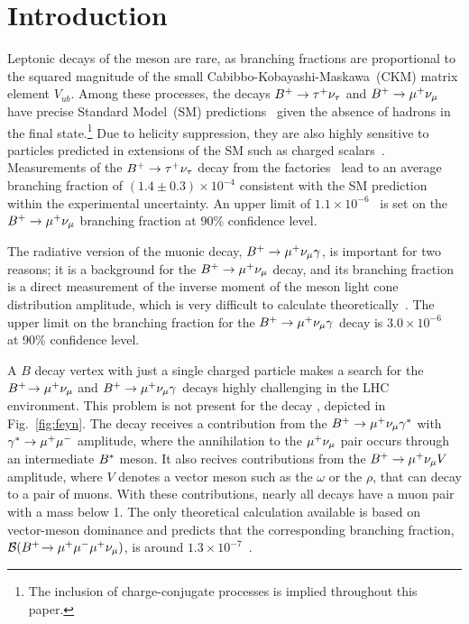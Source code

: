 
\section{Introduction}
\label{sec:Introduction}

Leptonic decays of the \Bp meson are rare, as branching fractions are proportional to the squared magnitude of the small
Cabibbo-Kobayashi-Maskawa~(CKM) matrix element $V_{ub}$. Among these
processes, the decays  $B^{+}\rightarrow{\ensuremath{\tau^+}}{\ensuremath{{\nu}_\tau}}$ and ${{{B}^+}}\rightarrow{\ensuremath{\mu^+}}{\ensuremath{{\nu}_\mu}}$ have
precise Standard Model~(SM) predictions~\cite{Silverman:1988gc} given
the absence of hadrons in the final state.\footnote{The inclusion of
charge-conjugate processes is implied throughout this paper.}  Due to
helicity suppression, they are also highly sensitive to particles
predicted in extensions of the SM such as charged
scalars~\cite{Isidori:2006pk}. Measurements of the ${{{B}^+}}\rightarrow{\ensuremath{\tau^+}}{\ensuremath{{\nu}_\tau}}$
decay from the \B factories~\cite{Kronenbitter:2015kls, Adachi:2012mm, 
Lees:2012ju,Aubert:2009wt} lead to an average branching fraction of 
$(1.4\pm0.3)\times 10^{-4}$\cite{HFLAV16} consistent with the SM 
prediction within the experimental uncertainty. An upper limit of $1.1\times 10^{-6}$~\cite{Sibidanov:2017vph} is set on the ${{{B}^+}}\rightarrow{\ensuremath{\mu^+}}{\ensuremath{{\nu}_\mu}}$ branching fraction at 90\% confidence level.

The radiative version of the muonic decay, ${{{B}^+}}\rightarrow{\ensuremath{\mu^+}}{\ensuremath{{\nu}_\mu}}\gamma$, is important for two reasons; it 
is a background for the ${{{B}^+}}\rightarrow{\ensuremath{\mu^+}}{\ensuremath{{\nu}_\mu}}$ decay, and its branching fraction is a direct measurement of the 
inverse moment of the \B meson light cone distribution amplitude, which
is very difficult to calculate theoretically~\cite{Beneke:2011nf}.
The upper limit on the branching fraction for the ${{{B}^+}}\rightarrow{\ensuremath{\mu^+}}{\ensuremath{{\nu}_\mu}}\gamma$ decay is $3.0\times
10^{-6}$~\cite{Gelb:2018end} at 90\%
confidence level.

A $B$ decay vertex with just a single charged particle makes a search for the \mbox{${{{B}^+}}\!\rightarrow \mu^{+}\nu_\mu$} and ${{{B}^+}}\rightarrow{\ensuremath{\mu^+}}{\ensuremath{{\nu}_\mu}}\gamma$ decays highly challenging in the LHC environment. This problem is not present for the decay \mbox{\Bmumumu}, depicted in Fig.~\ref{fig:feyn}. The decay receives a contribution from the ${{{B}^+}}\rightarrow{\ensuremath{\mu^+}}{\ensuremath{{\nu}_\mu}}\gamma^{*}$ with $\gamma^{*}\rightarrow{\ensuremath{\mu^+\mu^-}}$ amplitude, where the annihilation to the ${\mu^+}{{\nu}_\mu}$ pair occurs through an intermediate ${B}^\ast$ meson. It also recives contributions from the ${{{B}^+}}\rightarrow{\ensuremath{\mu^+}}{\ensuremath{{\nu}_\mu}} V$ amplitude, where $V$ denotes a vector meson such as the $\omega$ or the $\rho$, that can decay to a pair of muons. With these contributions, nearly all decays have a muon pair with a mass below 1\gevcc. The only theoretical calculation available is based on vector-meson dominance and predicts that the corresponding branching fraction, $\mathcal{B}({{{B}^+}}\!\rightarrow {\ensuremath{\mu^+}}{\ensuremath{\mu^-}}{\ensuremath{\mu^+}}{\ensuremath{{\nu}_\mu}})$, is around $1.3 \times 10^{-7}$~\cite{Danilina:2018uzr}. 

